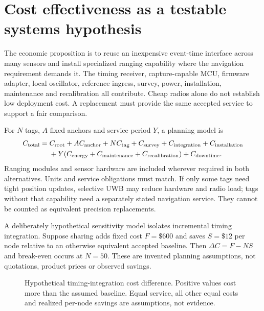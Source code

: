 \documentclass[11pt,letterpaper]{article}
\begin{document}
\section{Cost effectiveness as a testable systems hypothesis}\label{sec:cost}
The economic proposition is to reuse an inexpensive event-time interface across many sensors and install specialized ranging capability where the navigation requirement demands it. The timing receiver, capture-capable MCU, firmware adapter, local oscillator, reference ingress, survey, power, installation, maintenance and recalibration all contribute. Cheap radios alone do not establish low deployment cost. A replacement must provide the same accepted service to support a fair comparison.

For $N$ tags, $A$ fixed anchors and service period $Y$, a planning model is
\begin{align}
 C_{\rm total}={}&C_{\rm root}+A C_{\rm anchor}+N C_{\rm tag}
       +C_{\rm survey}+C_{\rm integration}+C_{\rm installation}\notag\\
       &+Y(C_{\rm energy}+C_{\rm maintenance}+C_{\rm recalibration})
       +C_{\rm downtime}.\label{eq:cost}
\end{align}
Ranging modules and sensor hardware are included wherever required in both alternatives. Units and service obligations must match. If only some tags need tight position updates, selective UWB may reduce hardware and radio load; tags without that capability need a separately stated navigation service. They cannot be counted as equivalent precision replacements.

A deliberately hypothetical sensitivity model isolates incremental timing integration. Suppose sharing adds fixed cost $F=\$600$ and saves $S=\$12$ per node relative to an otherwise equivalent accepted baseline. Then $\Delta C=F-NS$ and break-even occurs at $N=50$. These are invented planning assumptions, not quotations, product prices or observed savings.

\begin{figure}[ht]\centering
{}
\caption{Hypothetical timing-integration cost difference. Positive values cost more than the assumed baseline. Equal service, all other equal costs and realized per-node savings are assumptions, not evidence.}
\end{figure}
\end{document}
